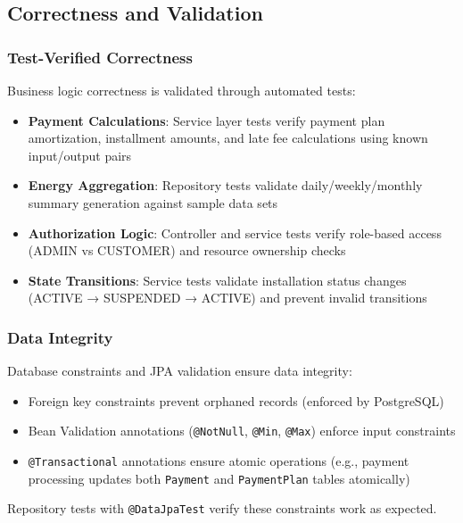 \subsection{Correctness and Validation}
\label{subsec:correctness-evaluation}

\subsubsection{Test-Verified Correctness}
\label{subsubsec:business-logic-validation}

Business logic correctness is validated through automated tests:
\begin{itemize}
    \item \textbf{Payment Calculations}: Service layer tests verify payment plan amortization, installment amounts, and late fee calculations using known input/output pairs
    \item \textbf{Energy Aggregation}: Repository tests validate daily/weekly/monthly summary generation against sample data sets
    \item \textbf{Authorization Logic}: Controller and service tests verify role-based access (ADMIN vs CUSTOMER) and resource ownership checks
    \item \textbf{State Transitions}: Service tests validate installation status changes (ACTIVE → SUSPENDED → ACTIVE) and prevent invalid transitions
\end{itemize}

\subsubsection{Data Integrity}
\label{subsubsec:data-integrity-validation}

Database constraints and JPA validation ensure data integrity:
\begin{itemize}
    \item Foreign key constraints prevent orphaned records (enforced by PostgreSQL)
    \item Bean Validation annotations (\texttt{@NotNull}, \texttt{@Min}, \texttt{@Max}) enforce input constraints
    \item \texttt{@Transactional} annotations ensure atomic operations (e.g., payment processing updates both \texttt{Payment} and \texttt{PaymentPlan} tables atomically)
\end{itemize}

Repository tests with \texttt{@DataJpaTest} verify these constraints work as expected.

